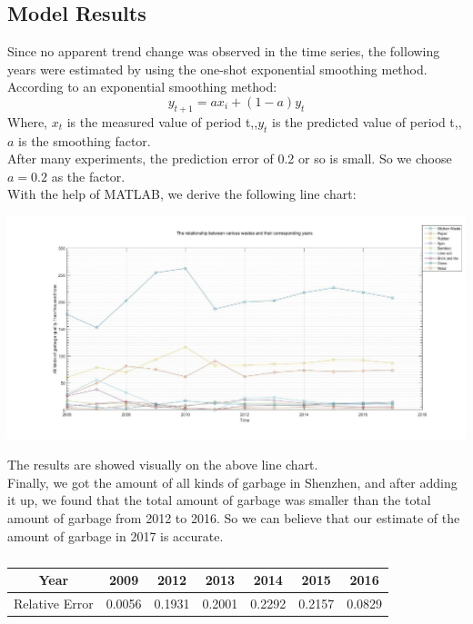 \documentclass[UTF8]{article}
\begin{document}
\subsection{Model Results}
\indent Since no apparent trend change was observed in the time series, the following years were estimated by using the one-shot exponential smoothing method.\\
\indent According to an exponential smoothing method:\\
\[y_{t+1}=ax_{i}+(1-a)y_t\]
\indent Where, \(x_t\) is the measured value of period t,,\(y_t\) is the predicted value of period t,,\(a\) is the smoothing factor.\\
\indent After many experiments, the prediction error of 0.2 or so is small. So we choose \(a=0.2\) as the factor.\\With the help of MATLAB, we derive the following line chart:\\
\begin{center}
\includegraphics{Answer1.jpg}\\
\end{center}
\indent The results are showed visually on the above line chart.\\
\indent Finally, we got the amount of all kinds of garbage in Shenzhen, and after adding it up, we found that the total amount of garbage was smaller than the total amount of garbage from 2012 to 2016. So we can believe that our estimate of the amount of garbage in 2017 is accurate.\\
\begin{table}[h]
\caption{}
\begin{center}
\begin{tabular}{ccccccc}
\hline
Year&2009&2012&2013&2014&2015&2016\\
\hline
Relative Error&0.0056&0.1931&0.2001&0.2292&0.2157&0.0829\\
\hline
\end{tabular}
\end{center}
\end{table}\\
\newpage
\end{document}
